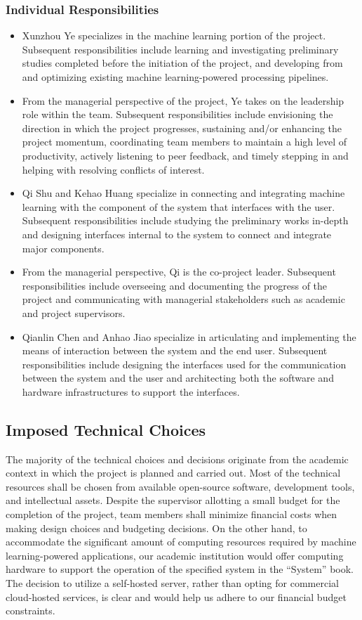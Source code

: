 \documentclass[12pt]{article}
\begin{document}
\subsubsection{Individual Responsibilities}
\begin{itemize}
    \item Xunzhou Ye specializes in the machine learning portion of the project. Subsequent responsibilities include learning and investigating preliminary studies completed before the initiation of the project, and developing from and optimizing existing machine learning-powered processing pipelines. 
    \item From the managerial perspective of the project, Ye takes on the leadership role within the team. Subsequent responsibilities include envisioning the direction in which the project progresses, sustaining and/or enhancing the project momentum, coordinating team members to maintain a high level of productivity, actively listening to peer feedback, and timely stepping in and helping with resolving conflicts of interest.
    \item Qi Shu and Kehao Huang specialize in connecting and integrating machine learning with the component of the system that interfaces with the user. Subsequent responsibilities include studying the preliminary works in-depth and designing interfaces internal to the system to connect and integrate major components.
    \item From the managerial perspective, Qi is the co-project leader. Subsequent responsibilities include overseeing and documenting the progress of the project and communicating with managerial stakeholders such as academic and project supervisors.
    \item Qianlin Chen and Anhao Jiao specialize in articulating and implementing the means of interaction between the system and the end user. Subsequent responsibilities include designing the interfaces used for the communication between the system and the user and architecting both the software and hardware infrastructures to support the interfaces. 
\end{itemize}


\subsection{Imposed Technical Choices}
The majority of the technical choices and decisions originate from the academic context in which the project is planned and carried out. Most of the technical resources shall be chosen from available open-source software, development tools, and intellectual assets. Despite the supervisor allotting a small budget for the completion of the project, team members shall minimize financial costs when making design choices and budgeting decisions. On the other hand, to accommodate the significant amount of computing resources required by machine learning-powered applications, our academic institution would offer computing hardware to support the operation of the specified system in the “System” book. The decision to utilize a self-hosted server, rather than opting for commercial cloud-hosted services, is clear and would help us adhere to our financial budget constraints.
\end{document}
